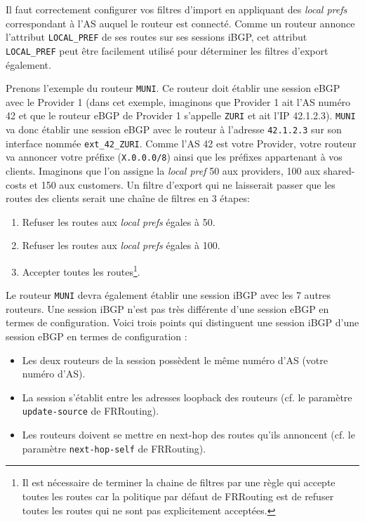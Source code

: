 \documentclass[a4paper, 11pt]{article}
\begin{document}
Il faut correctement configurer vos filtres d'import en appliquant
des \textit{local prefs} correspondant à l'AS auquel le routeur est connecté.
Comme un routeur annonce l'attribut \texttt{LOCAL\_PREF} de ses routes
sur ses sessions iBGP, cet attribut \texttt{LOCAL\_PREF} peut être
facilement utilisé pour déterminer les filtres d'export également.

Prenons l'exemple du routeur \texttt{MUNI}. Ce routeur doit
établir une session eBGP avec le Provider 1 (dans cet exemple,
imaginons que Provider 1 ait l'AS numéro 42 et que le routeur eBGP
de Provider 1 s'appelle \texttt{ZURI} et ait l'IP 42.1.2.3).
\texttt{MUNI} va donc établir une session eBGP avec le routeur
à l'adresse \texttt{42.1.2.3} sur son interface nommée
\texttt{ext\_42\_ZURI}. Comme l'AS 42 est votre Provider, votre
routeur va annoncer votre préfixe (\texttt{X.0.0.0/8}) ainsi que
les préfixes appartenant à vos clients.
Imaginons que l'on assigne la \textit{local pref} 50 aux providers, 100 aux
shared-costs et 150 aux customers. Un filtre d'export qui ne laisserait
passer que les routes des clients serait une chaîne de filtres en 3
étapes:
\begin{enumerate}
    \item Refuser les routes aux \textit{local prefs} égales à 50.
    \item Refuser les routes aux \textit{local prefs} égales à 100.
    \item Accepter toutes les routes\footnote{Il est nécessaire
    de terminer la chaine de filtres par une règle qui accepte
    toutes les routes car la politique par défaut de FRRouting est
    de refuser toutes les routes qui ne sont pas explicitement
    acceptées.}.
\end{enumerate}

Le routeur \texttt{MUNI} devra également établir une session iBGP
avec les 7 autres routeurs. Une session iBGP n'est pas très différente
d'une session eBGP en termes de configuration. Voici trois points
qui distinguent une session iBGP d'une session eBGP en termes de configuration :

\begin{itemize}
    \item Les deux routeurs de la session possèdent le même numéro d'AS
          (votre numéro d'AS).
    \item La session s'établit entre les adresses loopback des routeurs
          (cf. le paramètre \texttt{update-source} de FRRouting).
    \item Les routeurs doivent se mettre en next-hop des routes qu'ils
          annoncent (cf. le paramètre \texttt{next-hop-self} de FRRouting).
\end{itemize}
\end{document}
